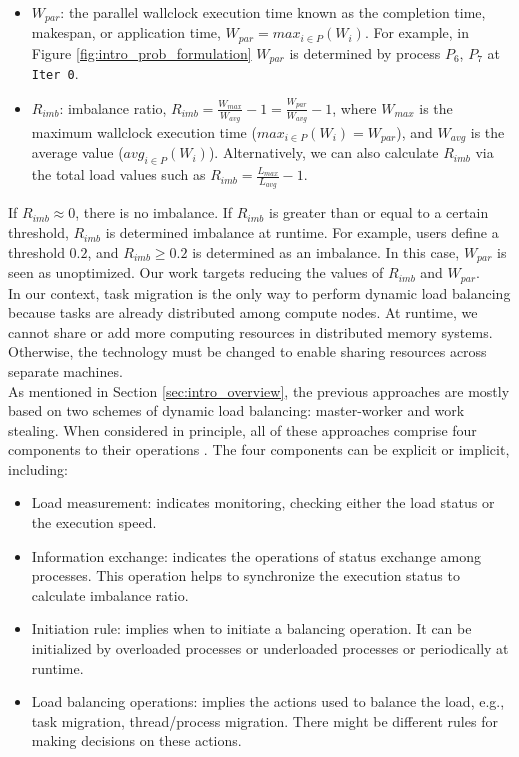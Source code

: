 \begin{itemize}
	\item $W_{par}$: the parallel wallclock execution time known as the completion time, makespan, or application time, $W_{par} = max_{i \in P}(W_{i})$. For example, in Figure \ref{fig:intro_prob_formulation} $W_{par}$ is determined by process $P_{6}$, $P_{7}$ at \texttt{Iter 0}.
	
	\item $R_{imb}$: imbalance ratio, $R_{imb} = \frac{W_{max}}{W_{avg}} - 1 = \frac{W_{par}}{W_{avg}} - 1$, where $W_{max}$ is the maximum wallclock execution time ($max_{i \in P}(W_{i}) = W_{par}$), and $W_{avg}$ is the average value ($avg_{i \in P}(W_{i})$). Alternatively, we can also calculate $R_{imb}$ via the total load values such as $R_{imb} = \frac{L_{max}}{L_{avg}} - 1$.
\end{itemize}

If $R_{imb} \approx 0$, there is no imbalance. If $R_{imb}$ is greater than or equal to a certain threshold, $R_{imb}$ is determined imbalance at runtime. For example, users define a threshold $0.2$, and $R_{imb} \geq 0.2$ is determined as an imbalance. In this case, $W_{par}$ is seen as unoptimized. Our work targets reducing the values of $R_{imb}$ and $W_{par}$.\\

In our context, task migration is the only way to perform dynamic load balancing because tasks are already distributed among compute nodes. At runtime, we cannot share or add more computing resources in distributed memory systems. Otherwise, the technology must be changed to enable sharing resources across separate machines.\\

As mentioned in Section \ref{sec:intro_overview}, the previous approaches are mostly based on two schemes of dynamic load balancing: master-worker and work stealing. When considered in principle, all of these approaches comprise four components to their operations \cite{xu1996load}. The four components can be explicit or implicit, including:
\begin{itemize}
	\item Load measurement: indicates monitoring, checking either the load status or the execution speed.
	\item Information exchange: indicates the operations of status exchange among processes. This operation helps to synchronize the execution status to calculate imbalance ratio.
	\item Initiation rule: implies when to initiate a balancing operation. It can be initialized by overloaded processes or underloaded processes or periodically at runtime.
	\item Load balancing operations: implies the actions used to balance the load, e.g., task migration, thread/process migration. There might be different rules \cite{xu1996load} for making decisions on these actions.

\end{itemize}


